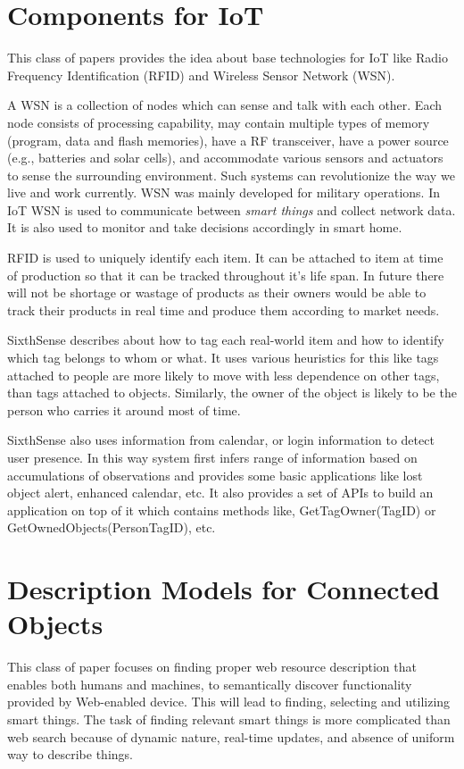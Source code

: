 \documentclass [a4paper,12pt]{book}
\begin{document}
\section{Components for IoT}
This class of papers provides the idea about base technologies for IoT like Radio Frequency Identification (RFID) and Wireless Sensor Network (WSN).
 
A WSN\cite{20} is a collection of nodes which can sense and talk with each other. Each node consists of processing capability, may contain multiple types of memory (program, data and flash memories), have a RF transceiver, have a power source (e.g., batteries and solar cells), and accommodate various sensors and actuators to sense the surrounding environment. Such systems can revolutionize the way we live and work currently. WSN was mainly developed for military operations. In IoT WSN is used to communicate between \emph{smart things} and collect network data. It is also used to monitor and take decisions accordingly in smart home.

RFID is used to uniquely identify each item. It can be attached to item at time of production so that it can be tracked throughout it's life span. In future there will not be shortage or wastage of products as their owners would be able to track their products in real time and produce them according to market needs.

SixthSense\cite{21} describes about how to tag each real-world item and how to identify which tag belongs to whom or what. It uses various heuristics for this like tags attached to people are more likely to move with less dependence on other tags, than tags attached to objects. Similarly, the owner of the object is likely to be the person who carries it around most of time.

SixthSense also uses information from calendar, or login information to detect user presence. In this way system first infers range of information based on accumulations of observations and provides some basic applications like lost object alert, enhanced calendar, etc. It also provides a set of APIs to build an application on top of it which contains methods like, GetTagOwner(TagID) or GetOwnedObjects(PersonTagID), etc.

\section{Description Models for Connected Objects}
This class of paper focuses on finding proper web resource description that enables both humans and machines, to semantically discover functionality provided by Web-enabled device. This will lead to finding, selecting and utilizing smart things. The task of finding relevant smart things is more complicated than web search because of dynamic nature, real-time updates, and absence of uniform way to describe things.
\end{document}
